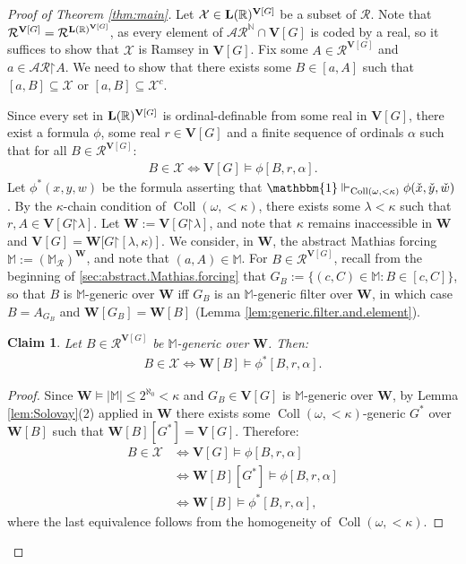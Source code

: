 \documentclass[11pt,reqno]{amsart}
\theoremstyle{plain}
\numberwithin{equation}{section}
\newtheorem{claim}[theorem]{Claim}
\theoremstyle{definition}
\newcommand{\func}{\operatorname}
\newcommand{\R}{\mathbb{R}}
\newcommand{\N}{\mathbb{N}}
\newcommand{\cal}{\mathcal}
\renewcommand{\bf}{\mathbf}
\newcommand{\forces}{\Vdash}
\newcommand{\one}{\mathbbm{1}}
\newcommand{\restrictedto}{\mathord{\upharpoonright}}
\newcommand{\Coll}{\func{Coll}}
\newcommand{\V}{\bf{V}}
\newcommand{\W}{\bf{W}}
\newcommand{\X}{\cal{X}}
\DeclareRobustCommand{\L}{\ifmmode\mathbf{L}\else\strokeL\fi}
\DeclareRobustCommand{\S}{\ifmmode\mathcal{S}\else\Sec\fi}
\newenvironment{midproof}[1][Proof]
  {\begin{proof}[#1]\renewcommand{\qedsymbol}{$\blacksquare$}}
  {\end{proof}}
\begin{document}
\begin{proof}[Proof of Theorem \ref{thm:main}]
    Let $\X \in \L(\R)^{\V[G]}$ be a subset of $\cal{R}$. Note that $\cal{R}^{\V[G]} = \cal{R}^{\L(\R)^{\V[G]}}$, as every element of $\cal{AR}^\N \cap \V[G]$ is coded by a real, so it suffices to show that $\X$ is Ramsey in $\V[G]$. Fix some $A \in \cal{R}^{\V[G]}$ and $a \in \cal{AR}\restrictedto A$. We need to show that there exists some $B \in [a,A]$ such that $[a,B] \subseteq \X$ or $[a,B] \subseteq \X^c$.
    
    Since every set in $\L(\R)^{\V[G]}$ is ordinal-definable from some real in $\V[G]$, there exist a formula $\phi$, some real $r \in \V[G]$ and a finite sequence of ordinals $\alpha$ such that for all $B \in \cal{R}^{\V[G]}$:
    \begin{align*}
        B \in \X \iff \V[G] \models \phi[B,r,\alpha].
    \end{align*}
    Let $\phi^*(x,y,w)$ be the formula asserting that $\one \forces_{\Coll(\omega,{<}\kappa)} \phi(\check{x},\check{y},\check{w})$. By the $\kappa$-chain condition of $\Coll(\omega,{<}\kappa)$, there exists some $\lambda < \kappa$ such that $r,A \in \V[G\restrictedto\lambda]$. Let $\W := \V[G\restrictedto\lambda]$, and note that $\kappa$ remains inaccessible in $\W$ and $\V[G] = \W[G\restrictedto[\lambda,\kappa)]$. We consider, in $\W$, the abstract Mathias forcing $\mathbb{M} := (\mathbb{M}_\cal{R})^\W$, and note that $(a,A) \in \mathbb{M}$. For $B \in \cal{R}^{\V[G]}$, recall from the beginning of \S\ref{sec:abstract.Mathias.forcing} that $G_B := \{(c,C) \in \mathbb{M} : B \in [c,C]\}$, so that $B$ is $\mathbb{M}$-generic over $\W$ iff $G_B$ is an $\mathbb{M}$-generic filter over $\W$, in which case $B = A_{G_B}$ and $\W[G_B] = \W[B]$ (Lemma \ref{lem:generic.filter.and.element}).

    \begin{claim}
    \label{claim:generic.in.X}
        Let $B \in \cal{R}^{\V[G]}$ be $\mathbb{M}$-generic over $\W$. Then:
        \begin{align*}
            B \in \X \iff \W[B] \models \phi^*[B,r,\alpha].
        \end{align*}
    \end{claim}

    \begin{midproof}
        Since $\W \models |\mathbb{M}| \leq 2^{\aleph_0} < \kappa$ and $G_B \in \V[G]$ is $\mathbb{M}$-generic over $\W$, by Lemma \ref{lem:Solovay}(2) applied in $\W$ there exists some $\Coll(\omega,{<}\kappa)$-generic $G^*$ over $\W[B]$ such that $\W[B][G^*] = \V[G]$. Therefore:
        \begin{align*}
            B \in \X &\iff \V[G] \models \phi[B,r,\alpha] \\
            &\iff \W[B][G^*] \models \phi[B,r,\alpha] \\
            &\iff \W[B] \models \phi^*[B,r,\alpha],
        \end{align*}
        where the last equivalence follows from the homogeneity of $\Coll(\omega,{<}\kappa)$.
    \end{midproof}


\end{proof}
\end{document}
